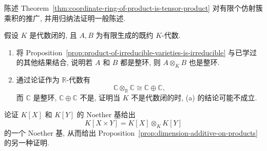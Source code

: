 \begin{BookExercises}
  \item\label{ex:coordinate-rings-of-finite-products} 陈述 Theorem~\ref{thm:coordinate-ring-of-product-is-tensor-product} 对有限个仿射簇乘积的推广, 并用归纳法证明一般陈述.
  \item\label{ex:tensor-product-of-domains-depends-on-ground-field} 假设 $K$ 是代数闭的, 且 $A,B$ 为有限生成的既约 $K$-代数.
  \begin{enumerate}
    \item 将 Proposition~\ref{prop:product-of-irreducible-varieties-is-irreducible} 与已学过的其他结果结合, 说明若 $A$ 和 $B$ 都是整环, 则 $A\otimes_{K}B$ 也是整环.
    \item 通过论证作为 $\mathbb{R}$-代数有
    \[
      \mathbb{C}\otimes_{\mathbb{R}}\mathbb{C}\cong\mathbb{C}\oplus\mathbb{C},
    \]
    而 $\mathbb{C}$ 是整环, $\mathbb{C}\oplus\mathbb{C}$ 不是, 证明当 $K$ 不是代数闭的时, (a) 的结论可能不成立.
  \end{enumerate}
  \item\label{ex:dimension-of-product-from-noether-bases} 论证 $K[X]$ 和 $K[Y]$ 的 Noether 基给出
  \[
    K[X\times Y]=K[X]\otimes_{K}K[Y]
  \]
  的一个 Noether 基, 从而给出 Proposition~\ref{prop:dimension-additive-on-products} 的另一种证明.
\end{BookExercises}
